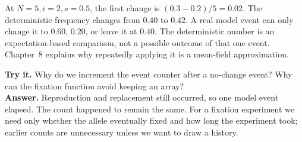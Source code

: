At \(N=5,i=2,s=0.5\), the first change is \((0.3-0.2)/5=0.02\). The deterministic frequency changes from \(0.40\) to \(0.42\). A real model event can only change it to \(0.60\), \(0.20\), or leave it at \(0.40\). The deterministic number is an expectation-based comparison, not a possible outcome of that one event. Chapter~8 explains why repeatedly applying it is a mean-field approximation.

\begin{checkpoint}
\textbf{Try it.} Why do we increment the event counter after a no-change event? Why can the fixation function avoid keeping an array?\\[3pt]
\textbf{Answer.} Reproduction and replacement still occurred, so one model event elapsed. The count happened to remain the same. For a fixation experiment we need only whether the allele eventually fixed and how long the experiment took; earlier counts are unnecessary unless we want to draw a history.
\end{checkpoint}
